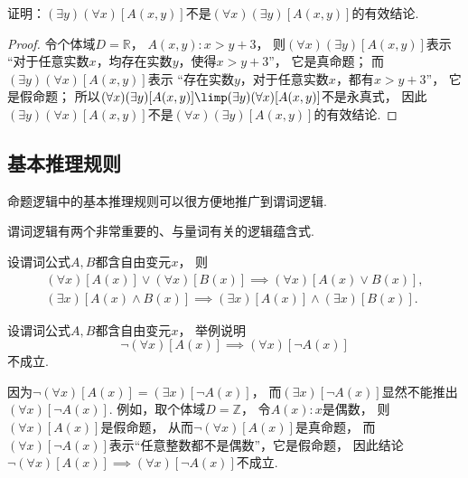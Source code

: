 \begin{example}
证明：\((\exists y)(\forall x)[A(x,y)]\)不是\((\forall x)(\exists y)[A(x,y)]\)的有效结论.
\begin{proof}
令个体域\(D=\mathbb{R}\)，
\(A(x,y): x>y+3\)，
则\((\forall x)(\exists y)[A(x,y)]\)表示
“对于任意实数\(x\)，均存在实数\(y\)，使得\(x>y+3\)”，
它是真命题；
而\((\exists y)(\forall x)[A(x,y)]\)表示
“存在实数\(y\)，对于任意实数\(x\)，都有\(x>y+3\)”，
它是假命题；
所以\((\forall x)(\exists y)[A(x,y)] \limp (\exists y)(\forall x)[A(x,y)]\)不是永真式，
因此\((\exists y)(\forall x)[A(x,y)]\)不是\((\forall x)(\exists y)[A(x,y)]\)的有效结论.
\end{proof}
\end{example}

\subsection{基本推理规则}
命题逻辑中的基本推理规则可以很方便地推广到谓词逻辑.

谓词逻辑有两个非常重要的、与量词有关的逻辑蕴含式.
\begin{theorem}\label{theorem:一阶逻辑.基本推理规则}
设谓词公式\(A,B\)都含自由变元\(x\)，
则\begin{gather}
	(\forall x)[A(x)] \lor (\forall x)[B(x)]
	\implies (\forall x)[A(x) \lor B(x)], \\
	(\exists x)[A(x) \land B(x)]
	\implies (\exists x)[A(x)] \land (\exists x)[B(x)].
\end{gather}
\end{theorem}

\begin{example}
设谓词公式\(A,B\)都含自由变元\(x\)，
举例说明\begin{equation*}
	\neg(\forall x)[A(x)] \implies (\forall x)[\neg A(x)]
\end{equation*}不成立.
\begin{solution}
因为\(
	\neg(\forall x)[A(x)]
	= (\exists x)[\neg A(x)]
\)，
而\((\exists x)[\neg A(x)]\)显然不能推出\((\forall x)[\neg A(x)]\).
例如，取个体域\(D = \mathbb{Z}\)，
令\(A(x): \text{$x$是偶数}\)，
则\((\forall x)[A(x)]\)是假命题，
从而\(\neg(\forall x)[A(x)]\)是真命题，
而\((\forall x)[\neg A(x)]\)表示“任意整数都不是偶数”，它是假命题，
因此结论\(\neg(\forall x)[A(x)] \implies (\forall x)[\neg A(x)]\)不成立.
\end{solution}
\end{example}


